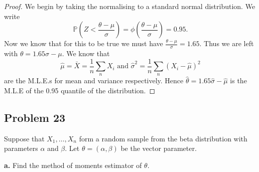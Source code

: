 \documentclass{article}
\renewcommand{\P}[1]{\mathbb{P}\left(#1\right)}
\newcommand{\randsamp}{X_1,\dots,X_n}
\begin{document}
\begin{proof}
    We begin by taking the normalising to a standard normal distribution. We write
    \begin{equation*}
        \P{Z < \frac{\theta - \mu}{\sigma}} =
        \phi\left(\frac{\theta - \mu}{\sigma}\right) = 0.95.
    \end{equation*}
    Now we know that for this to be true we must have
    $\frac{\theta - \mu}{\sigma} = 1.65$. Thus we are left with
    $\theta = 1.65\sigma - \mu$. We know that
    \begin{equation*}
        \hat{\mu} = \bar{X} = \frac{1}{n}\sum_n X_i
        \text{ and }
        \hat{\sigma}^2 = \frac{1}{n}\sum_n(X_i - \hat{\mu})^2
    \end{equation*}
    are the M.L.E.s for mean and variance respectively. Hence
    $\hat{\theta} = 1.65\hat{\sigma} - \hat{\mu}$ is the M.L.E of the 0.95 quantile
    of the distribution.
\end{proof}

\subsection*{Problem 23}
Suppose that $\randsamp$ form a random sample from the beta distribution
with parameters $\alpha$ and $\beta$. Let $\theta = (\alpha, \beta)$ be the
vector parameter.

\textbf{a.} Find the method of moments estimator of $\theta$.
\end{document}
